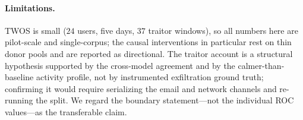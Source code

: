 \documentclass[10pt]{article}
\begin{document}
\paragraph{Limitations.} TWOS is small ($24$ users, five days, $37$ traitor
windows), so all numbers here are pilot-scale and single-corpus; the causal
interventions in particular rest on thin donor pools and are reported as
directional. The traitor account is a structural hypothesis supported by the
cross-model agreement and by the calmer-than-baseline activity profile, not by
instrumented exfiltration ground truth; confirming it would require serializing
the email and network channels and re-running the split. We regard the boundary
statement---not the individual ROC values---as the transferable claim.



\end{document}
